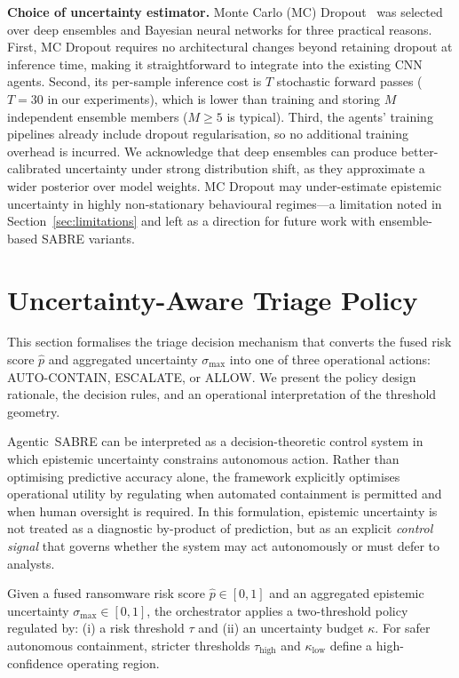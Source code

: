 \documentclass[3p]{elsarticle}
\begin{document}
\noindent\textbf{Choice of uncertainty estimator.}
Monte Carlo (MC) Dropout~\cite{gal2016dropout} was selected over deep ensembles and Bayesian
neural networks for three practical reasons. First, MC Dropout requires no architectural
changes beyond retaining dropout at inference time, making it straightforward to integrate
into the existing CNN agents. Second, its per-sample inference cost is $T$ stochastic forward
passes ($T = 30$ in our experiments), which is lower than training and storing $M$ independent
ensemble members ($M \ge 5$ is typical). Third, the agents' training pipelines already include
dropout regularisation, so no additional training overhead is incurred. We acknowledge that
deep ensembles can produce better-calibrated uncertainty under strong distribution shift,
as they approximate a wider posterior over model weights. MC Dropout may under-estimate
epistemic uncertainty in highly non-stationary behavioural regimes---a limitation noted in
Section~\ref{sec:limitations} and left as a direction for future work with ensemble-based
SABRE variants.


\section{Uncertainty-Aware Triage Policy}
\label{sec:uncert_policy}

This section formalises the triage decision mechanism that converts the fused risk score
$\hat{p}$ and aggregated uncertainty $\sigma_{\max}$ into one of three operational actions:
\textsc{AUTO-CONTAIN}, \textsc{ESCALATE}, or \textsc{ALLOW}. We present the policy design
rationale, the decision rules, and an operational interpretation of the threshold geometry.

Agentic~SABRE can be interpreted as a decision-theoretic control system in which
epistemic uncertainty constrains autonomous action. Rather than optimising
predictive accuracy alone, the framework explicitly optimises operational utility
by regulating when automated containment is permitted and when human oversight
is required. In this formulation, epistemic uncertainty is not treated as a
diagnostic by-product of prediction, but as an explicit \emph{control signal}
that governs whether the system may act autonomously or must defer to analysts.

Given a fused ransomware risk score $\hat{p} \in [0,1]$ and an aggregated epistemic
uncertainty $\sigma_{\max} \in [0,1]$, the orchestrator applies a two-threshold
policy regulated by: (i) a risk threshold $\tau$ and (ii) an uncertainty budget
$\kappa$. For safer autonomous containment, stricter thresholds
$\tau_{\text{high}}$ and $\kappa_{\text{low}}$ define a high-confidence operating
region.
\end{document}

